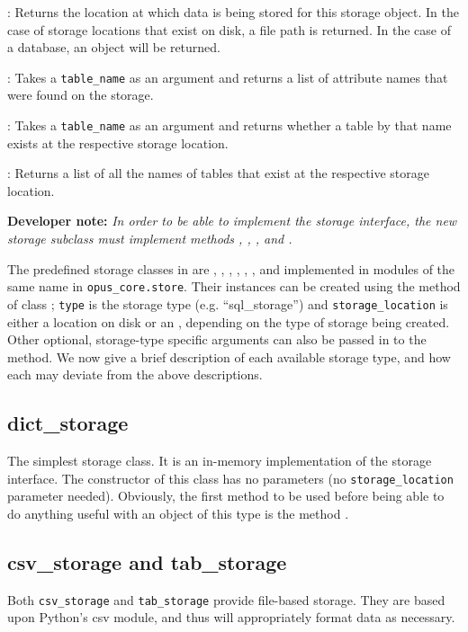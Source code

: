 {\bf {}}: Returns the location at which data is
being stored for this storage object. In the case of storage locations that
exist on disk, a file path is returned. In the case of a database, an
 object will be returned. 

{\bf {}}: Takes a \verb|table_name| as an
argument and returns a list of attribute names that were found on the storage.

{\bf {}}: Takes a \verb|table_name| as an
argument and returns whether a table by that name exists at the respective
storage location.

{\bf {}}: Returns a list of all the names of tables
that exist at the respective storage location.

{\bf Developer note:} \textit{In order to be able to implement the storage
interface, the new storage subclass must implement methods ,
, ,
and .}

The predefined storage classes in  are , ,
, , , , 
and  implemented
in modules of the same name in \verb|opus_core.store|. Their instances can be
created using the method  of
class ; \verb|type| is the storage type (e.g. ``sql_storage'')
and \verb|storage_location| is either a location on disk or an
, depending on the type of storage being created.
Other optional, storage-type specific arguments can also be passed in to the
 method. We now give a brief description of each available
storage type, and how each may deviate from the above descriptions. 

\subsection{dict_storage}
\label{sec:ram-storage}
%
The simplest storage class. It is an in-memory implementation of the
storage interface. The constructor of this class has no parameters (no \verb|storage_location|
parameter needed). Obviously, the first method to be used 
before being able to do anything useful with an object of this type is the method
.

\subsection{csv_storage and tab_storage}
%
Both \verb|csv_storage| and \verb|tab_storage| provide file-based storage.  
They are based upon Python's csv module, and thus will appropriately
format data as necessary.

